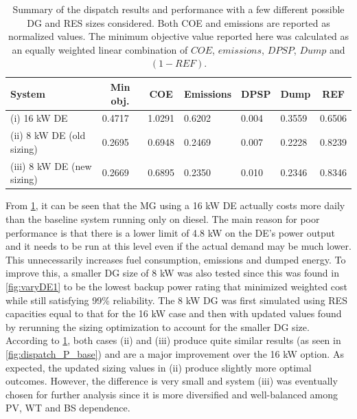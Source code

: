 \documentclass[final,3p,times]{elsarticle}
\begin{document}
\begin{table}[htbp]
\centering
\begin{tabular}{p{5cm} p{0.1cm} p{0.1cm} p{0.1cm} p{0.1cm} p{0.1cm} p{0.1cm}}
\toprule
\multicolumn{1}{l}{\textbf{System}} & \multicolumn{1}{c}{\textbf{Min obj.}} & \multicolumn{1}{c}{\textbf{COE}} & \multicolumn{1}{c}{\textbf{Emissions}} & \multicolumn{1}{c}{\textbf{DPSP}} & \multicolumn{1}{c}{\textbf{Dump}} & \multicolumn{1}{c}{\textbf{REF}} \\
\midrule
(i) 16 kW DE & 0.4717 & 1.0291 & 0.6202  & 0.004 & 0.3559 & 0.6506     \\
(ii) 8 kW DE (old sizing) & 0.2695 & 0.6948 & 0.2469 & 0.007 & 0.2228 & 0.8239 
 \\
(iii) 8 kW DE (new sizing) & 0.2669 & 0.6895 & 0.2350 & 0.010 & 0.2346 & 0.8346   \\
\bottomrule
\end{tabular}
\caption{\label{tab:DG_size} Summary of the dispatch results and performance with a few different possible DG and RES sizes considered. Both COE and emissions are reported as normalized values. The minimum objective value reported here was calculated as an equally weighted linear combination of $COE$, $emissions$, $DPSP$, $Dump$ and $(1-REF)$.}
\end{table}

From \cref{tab:DG_size}, it can be seen that the MG using a 16 kW DE actually costs more daily than the baseline system running only on diesel. The main reason for poor performance is that there is a lower limit of 4.8 kW on the DE's power output and it needs to be run at this level even if the actual demand may be much lower. This unnecessarily increases fuel consumption, emissions and dumped energy. To improve this, a smaller DG size of 8 kW was also tested since this was found in \cref{fig:varyDE1} to be the lowest backup power rating that minimized weighted cost while still satisfying 99\% reliability. The 8 kW DG was first simulated using RES capacities equal to that for the 16 kW case and then with updated values found by rerunning the sizing optimization to account for the smaller DG size. According to \cref{tab:DG_size}, both cases (ii) and (iii) produce quite similar results (as seen in \cref{fig:dispatch_P_base}) and are a major improvement over the 16 kW option. As expected, the updated sizing values in (ii) produce slightly more optimal outcomes. However, the difference is very small and system (iii) was eventually chosen for further analysis since it is more diversified and well-balanced among PV, WT and BS dependence.
\end{document}
